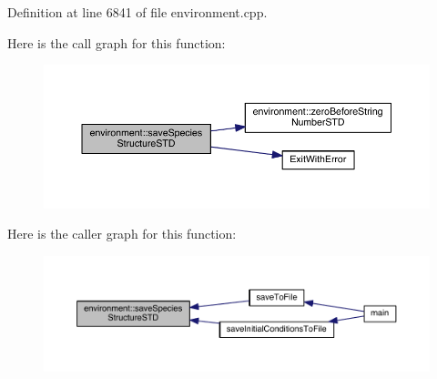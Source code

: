Definition at line 6841 of file environment.\-cpp.



Here is the call graph for this function\-:
\nopagebreak
\begin{figure}[H]
\begin{center}
\leavevmode
\includegraphics[width=350pt]{a00014_a9daeb4f255100b8ad59de9ea80b19b5b_cgraph}
\end{center}
\end{figure}




Here is the caller graph for this function\-:
\nopagebreak
\begin{figure}[H]
\begin{center}
\leavevmode
\includegraphics[width=350pt]{a00014_a9daeb4f255100b8ad59de9ea80b19b5b_icgraph}
\end{center}
\end{figure}



